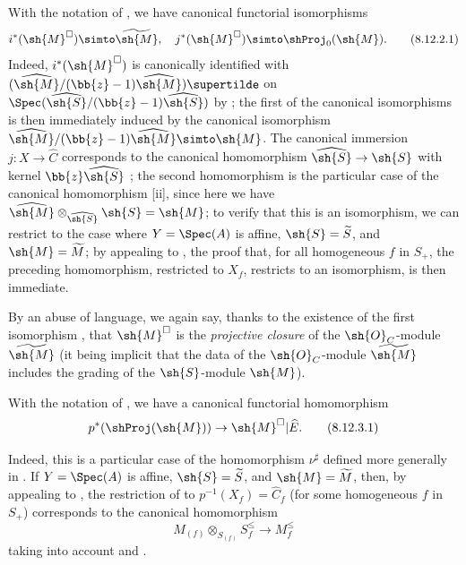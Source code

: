 \begin{proposition}[8.12.2]
\label{II.8.12.2}
With the notation of , we have canonical functorial isomorphisms
\[
\label{II.8.12.2.1}
    i^*(\sh{M}^\square)\simto\widetilde{\sh{M}},
    \quad
    j^*(\sh{M}^\square)\simto\shProj_0(\sh{M}).
\tag{8.12.2.1}
\]
Indeed, $i^*(\sh{M}^\square)$ is canonically identified with $(\widehat{\sh{M}}/(\bb{z}-1)\widehat{\sh{M}})\supertilde$ on $\Spec(\widehat{\sh{S}}/(\bb{z}-1)\widehat{\sh{S}})$ by ;
the first of the canonical isomorphisms  is then immediately induced  by the canonical isomorphism $\widehat{\sh{M}}/(\bb{z}-1)\widehat{\sh{M}}\simto\sh{M}$.
The canonical immersion $j:X\to\widehat{C}$ corresponds to the canonical homomorphism $\widehat{\sh{S}}\to\sh{S}$ with kernel $\bb{z}\widehat{\sh{S}}$ ;
the second homomorphism  is the particular case of the canonical homomorphism [ii], since here we have $\widehat{\sh{M}}\otimes_{\widehat{\sh{S}}}\sh{S}=\sh{M}$;
to verify that this is an isomorphism, we can restrict to the case where $Y=\Spec(A)$ is affine, $\sh{S}=\widetilde{S}$, and $\sh{M}=\widetilde{M}$;
by appealing to , the proof that, for all homogeneous $f$ in $S_+$, the preceding homomorphism, restricted to $X_f$, restricts to an isomorphism, is then immediate.
\end{proposition}


By an abuse of language, we again say, thanks to the existence of the first isomorphism , that $\sh{M}^\square$ is the \emph{projective closure} of the $\sh{O}_C$-module $\widetilde{\sh{M}}$ (it being implicit that the data of the $\sh{O}_C$-module $\widetilde{\sh{M}}$ includes the grading of the $\sh{S}$-module $\sh{M}$).

\begin{env}[8.12.3]
\label{II.8.12.3}
With the notation of , we have a canonical functorial homomorphism
\[
\label{II.8.12.3.1}
    p^*(\shProj(\sh{M}))\to\sh{M}^\square|\widehat{E}.
\tag{8.12.3.1}
\]

Indeed, this is a particular case of the homomorphism $\nu^\sharp$ defined more generally in .
If $Y=\Spec(A)$ is affine, $\sh{S}=\widetilde{S}$, and $\sh{M}=\widetilde{M}$, then, by appealing to , the restriction of  to $p^{-1}(X_f)=\widehat{C}_f$ (for some homogeneous $f$ in $S_+$) corresponds to the canonical homomorphism
\[
\label{II.8.12.3.2}
    M_{(f)}\otimes_{S_{(f)}}S_f^\leq \to M_f^\leq
\tag{8.12.3.2}
\]
taking into account  and .
\end{env}

